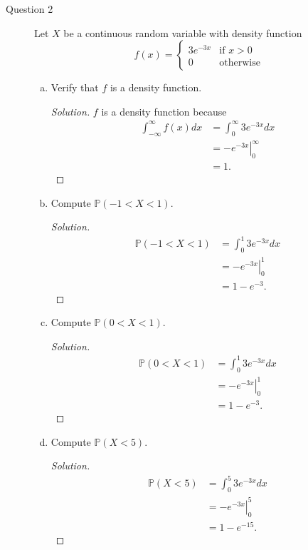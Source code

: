 \documentclass[addpoints, 11pt]{exam}
\newcommand*{\p}{\mathds{P}}
\begin{document}
\begin{description}
    \newpage

    \item[Question 2] Let $X$ be a continuous random variable with density function
    \[
        f(x) = \begin{cases}
            3e^{-3x} & \text{if }x > 0 \\
            0 & \text{otherwise}
        \end{cases}
    \]
    \begin{enumerate}[(a)]
        \item Verify that $f$ is a density function.
        \begin{proof}[Solution]
        $f$ is a density function because
            \begin{align*}
                \int^{\infty}_{-\infty} f(x) dx
                &= \int^{\infty}_{0} 3e^{-3x} dx \\
                &= \left.-e^{-3x} \right|^{\infty}_0 \\
                &= 1.
            \end{align*}
        \end{proof}

        \item Compute $\p(-1 < X < 1)$.
        \begin{proof}[Solution]
            \begin{align*}
                \p(-1 < X < 1) 
                &= \int^{1}_{0} 3e^{-3x} dx \\
                &= \left.-e^{-3x} \right|^{1}_{0} \\
                &= 1 - e^{-3}.
            \end{align*}
        \end{proof}

        \item Compute $\p(0 < X < 1)$.
        \begin{proof}[Solution]
            \begin{align*}
                \p(0 < X < 1) 
                &= \int^{1}_{0} 3e^{-3x} dx \\
                &= \left.-e^{-3x} \right|^{1}_{0} \\
                &= 1 - e^{-3}.
            \end{align*}
        \end{proof}

        \item Compute $\p(X < 5)$.
        \begin{proof}[Solution]
            \begin{align*}
                \p(X < 5) 
                &= \int^{5}_{0} 3e^{-3x} dx \\
                &= \left.-e^{-3x} \right|^{5}_{0} \\
                &= 1 - e^{-15}.
            \end{align*}
        \end{proof}


\end{enumerate}
\end{description}
\end{document}
